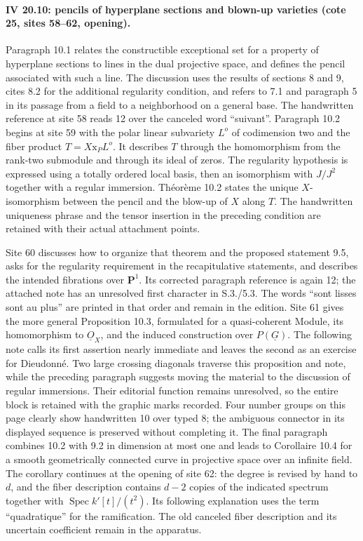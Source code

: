 \paragraph{IV 20.10: pencils of hyperplane sections and blown-up varieties (cote 25, sites 58--62, opening).}
Paragraph 10.1 relates the constructible exceptional set for a property of hyperplane sections to lines in the dual projective space, and defines the pencil associated with such a line. The discussion uses the results of sections 8 and 9, cites 8.2 for the additional regularity condition, and refers to 7.1 and paragraph 5 in its passage from a field to a neighborhood on a general base. The handwritten reference at site 58 reads 12 over the canceled word ``suivant''. Paragraph 10.2 begins at site 59 with the polar linear subvariety $L^o$ of codimension two and the fiber product $T=X\mathbin{\mathrm x}_P L^o$. It describes $T$ through the homomorphism from the rank-two submodule and through its ideal of zeros. The regularity hypothesis is expressed using a totally ordered local basis, then an isomorphism with $J/J^2$ together with a regular immersion. Th\'eor\`eme 10.2 states the unique $X$-isomorphism between the pencil and the blow-up of $X$ along $T$. The handwritten uniqueness phrase and the tensor insertion in the preceding condition are retained with their actual attachment points.

Site 60 discusses how to organize that theorem and the proposed statement 9.5, asks for the regularity requirement in the recapitulative statements, and describes the intended fibrations over $\mathbf P^1$. Its corrected paragraph reference is again 12; the attached note has an unresolved first character in S.3./5.3. The words ``sont lisses sont au plus'' are printed in that order and remain in the edition. Site 61 gives the more general Proposition 10.3, formulated for a quasi-coherent Module, its homomorphism to $\underline O_X$, and the induced construction over $P(\underline G)$. The following note calls its first assertion nearly immediate and leaves the second as an exercise for Dieudonn\'e. Two large crossing diagonals traverse this proposition and note, while the preceding paragraph suggests moving the material to the discussion of regular immersions. Their editorial function remains unresolved, so the entire block is retained with the graphic marks recorded. Four number groups on this page clearly show handwritten 10 over typed 8; the ambiguous connector in its displayed sequence is preserved without completing it. The final paragraph combines 10.2 with 9.2 in dimension at most one and leads to Corollaire 10.4 for a smooth geometrically connected curve in projective space over an infinite field. The corollary continues at the opening of site 62: the degree is revised by hand to $d$, and the fiber description contains $d-2$ copies of the indicated spectrum together with $\operatorname{Spec}k'[t]/(t^2)$. Its following explanation uses the term ``quadratique'' for the ramification. The old canceled fiber description and its uncertain coefficient remain in the apparatus.
